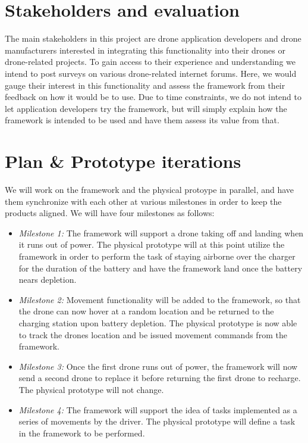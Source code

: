 \documentclass[11pt]{article} %
\begin{document}
\section{Stakeholders and evaluation}
The main stakeholders in this project are drone application developers and drone manufacturers interested in integrating this functionality into their drones or drone-related projects. To gain access to their experience and understanding we intend to post surveys on various drone-related internet forums. Here, we would gauge their interest in this functionality and assess the framework from their feedback on how it would be to use. Due to time constraints, we do not intend to let application developers try the framework, but will simply explain how the framework is intended to be used and have them assess its value from that.

\section{Plan \& Prototype iterations}
We will work on the framework and the physical protoype in parallel, and have them synchronize with each other at various milestones in order to keep the products aligned. We will have four milestones as follows:

\begin{itemize}
\item \emph{Milestone 1:} The framework will support a drone taking off and landing when it runs out of power. The physical prototype will at this point utilize the framework in order to perform the task of staying airborne over the charger for the duration of the battery and have the framework land once the battery nears depletion.
\item \emph{Milestone 2:} Movement functionality will be added to the framework, so that the drone can now hover at a random location and be returned to the charging station upon battery depletion. The physical prototype is now able to track the drones location and be issued movement commands from the framework.
\item \emph{Milestone 3:} Once the first drone runs out of power, the framework will now send a second drone to replace it before returning the first drone to recharge. The physical prototype will not change.
\item \emph{Milestone 4:} The framework will support the idea of tasks implemented as a series of movements by the driver. The physical prototype will define a task in the framework to be performed.
\end{itemize}
\end{document}
